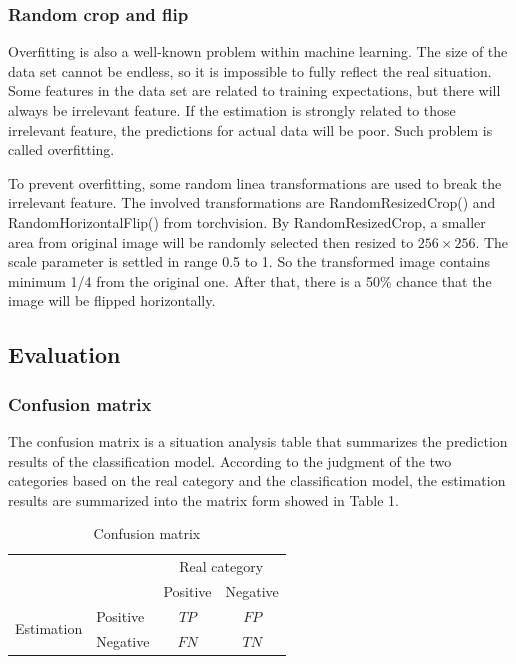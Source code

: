 \documentclass[10pt,journal,compsoc]{IEEEtran}
\begin{document}
\subsubsection{Random crop and flip}
Overfitting is also a well-known problem within machine learning.
The size of the data set cannot be endless, so it is impossible to fully reflect the real situation.
Some features in the data set are related to training expectations, but there will always be irrelevant feature.
If the estimation is strongly related to those irrelevant feature, the predictions for actual data will be poor. 
Such problem is called overfitting.
\par
To prevent overfitting, some random linea \linebreak transformations are used to break the irrelevant feature. 
The involved transformations are RandomResizedCrop() and RandomHorizontalFlip() from torchvision.
By RandomResizedCrop, a smaller area from original image will be randomly selected then resized to {$256 \times 256$}.
The scale parameter is settled in range 0.5 to 1. So the transformed image contains minimum 1/4 from the original one.
After that, there is a 50\% chance that the image will be flipped horizontally.


\subsection{Evaluation}

\subsubsection{Confusion matrix}
The confusion matrix is a situation analysis table that \linebreak summarizes the prediction results of the classification model. 
According to the judgment of the two categories based on the real category and the classification model, the estimation results are summarized into the matrix form showed in Table 1. 

\begin{table}[h!]
\centering
\begin{tabular}{l|l|c|c|}
\multicolumn{2}{c}{}&\multicolumn{2}{c}{Real category}\\
\cline{3-4}
\multicolumn{2}{c|}{}&Positive&Negative\\
\cline{2-4}
\multirow{2}{*}{Estimation}& Positive & $TP$ & $FP$\\
\cline{2-4}
& Negative & $FN$ & $TN$\\
\cline{2-4}
\end{tabular} 
\caption{Confusion matrix}
\end{table}
\end{document}
